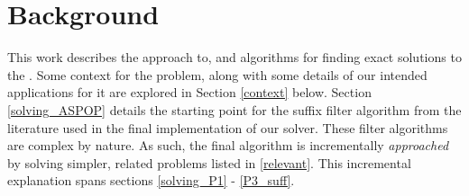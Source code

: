 \chapter{Background} \label{background}

This work describes the approach to, and algorithms for finding exact solutions to the \aspop{}. Some context for the problem, along with some details of our intended applications for it are explored in Section \ref{context} below. Section \ref{solving_ASPOP} details the starting point for the \gls{suffix filter} algorithm from the literature used in the final implementation of our solver. These \glspl{filter algorithm} are complex by nature. As such, the final algorithm is incrementally \textit{approached} by solving simpler, related problems listed in \ref{relevant}. This incremental explanation spans sections \ref{solving_P1} - \ref{P3_suff}.






